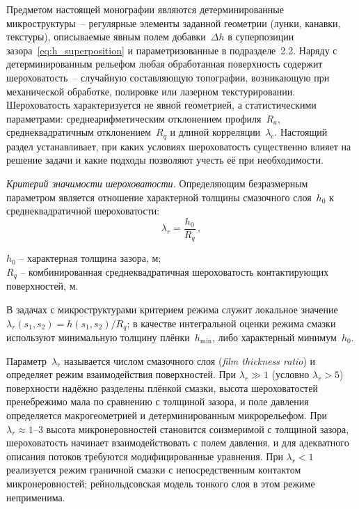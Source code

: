 Предметом настоящей монографии являются детерминированные
микроструктуры~-- регулярные элементы заданной геометрии (лунки,
канавки, текстуры), описываемые явным полем добавки~$\Delta h$
в суперпозиции зазора~\eqref{eq:h_superposition} и параметризованные
в подразделе~2.2. Наряду с детерминированным рельефом любая
обработанная поверхность содержит шероховатость~-- случайную
составляющую топографии, возникающую при механической обработке,
полировке или лазерном текстурировании. Шероховатость
характеризуется не явной геометрией, а статистическими параметрами:
среднеарифметическим отклонением профиля~$R_a$,
среднеквадратичным отклонением~$R_q$ и длиной
корреляции~$\lambda_c$. Настоящий раздел устанавливает, при каких
условиях шероховатость существенно влияет на решение задачи
и какие подходы позволяют учесть её при необходимости.

\textit{Критерий значимости шероховатости.}
Определяющим безразмерным параметром является отношение
характерной толщины смазочного слоя~$h_0$ к среднеквадратичной
шероховатости:
\begin{equation}
  \lambda_r = \frac{h_0}{R_q}\,,
  \label{eq:lambda_roughness}
\end{equation}
\begin{conditions}
$h_0$ -- характерная толщина зазора, м;\\
$R_q$ -- комбинированная среднеквадратичная шероховатость
контактирующих поверхностей, м.
\end{conditions}
В задачах с микроструктурами критерием режима служит локальное значение $\lambda_r(s_1, s_2) = h(s_1, s_2)/R_q$; в качестве интегральной оценки режима смазки используют минимальную толщину плёнки~$h_{\min}$, либо характерный минимум~$h_0$.

Параметр~$\lambda_r$ называется числом смазочного слоя
(\textit{film thickness ratio}) и определяет режим взаимодействия
поверхностей. При $\lambda_r \gg 1$ (условно $\lambda_r > 5$)
поверхности надёжно разделены плёнкой смазки, высота
шероховатостей пренебрежимо мала по сравнению с толщиной зазора,
и поле давления определяется макрогеометрией и детерминированным
микрорельефом. При $\lambda_r \approx 1\text{--}3$ высота
микронеровностей становится соизмеримой с толщиной зазора,
шероховатость начинает взаимодействовать с полем давления, и для
адекватного описания потоков требуются модифицированные уравнения.
При $\lambda_r < 1$ реализуется режим граничной смазки
с непосредственным контактом микронеровностей; рейнольдсовская
модель тонкого слоя в этом режиме неприменима.

